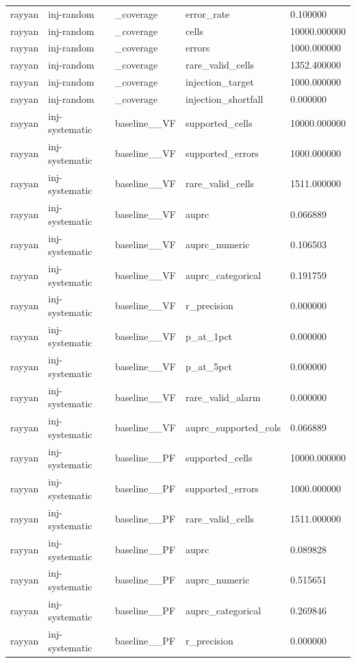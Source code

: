 \begin{tabular}{lllll}
rayyan & inj-random & \_coverage & error\_rate & 0.100000 \\
rayyan & inj-random & \_coverage & cells & 10000.000000 \\
rayyan & inj-random & \_coverage & errors & 1000.000000 \\
rayyan & inj-random & \_coverage & rare\_valid\_cells & 1352.400000 \\
rayyan & inj-random & \_coverage & injection\_target & 1000.000000 \\
rayyan & inj-random & \_coverage & injection\_shortfall & 0.000000 \\
rayyan & inj-systematic & baseline\_\_VF & supported\_cells & 10000.000000 \\
rayyan & inj-systematic & baseline\_\_VF & supported\_errors & 1000.000000 \\
rayyan & inj-systematic & baseline\_\_VF & rare\_valid\_cells & 1511.000000 \\
rayyan & inj-systematic & baseline\_\_VF & auprc & 0.066889 \\
rayyan & inj-systematic & baseline\_\_VF & auprc\_numeric & 0.106503 \\
rayyan & inj-systematic & baseline\_\_VF & auprc\_categorical & 0.191759 \\
rayyan & inj-systematic & baseline\_\_VF & r\_precision & 0.000000 \\
rayyan & inj-systematic & baseline\_\_VF & p\_at\_1pct & 0.000000 \\
rayyan & inj-systematic & baseline\_\_VF & p\_at\_5pct & 0.000000 \\
rayyan & inj-systematic & baseline\_\_VF & rare\_valid\_alarm & 0.000000 \\
rayyan & inj-systematic & baseline\_\_VF & auprc\_supported\_cols & 0.066889 \\
rayyan & inj-systematic & baseline\_\_PF & supported\_cells & 10000.000000 \\
rayyan & inj-systematic & baseline\_\_PF & supported\_errors & 1000.000000 \\
rayyan & inj-systematic & baseline\_\_PF & rare\_valid\_cells & 1511.000000 \\
rayyan & inj-systematic & baseline\_\_PF & auprc & 0.089828 \\
rayyan & inj-systematic & baseline\_\_PF & auprc\_numeric & 0.515651 \\
rayyan & inj-systematic & baseline\_\_PF & auprc\_categorical & 0.269846 \\
rayyan & inj-systematic & baseline\_\_PF & r\_precision & 0.000000 \\

\end{tabular}
